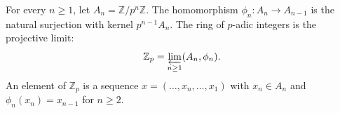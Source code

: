 For every $n \geq 1$, let $A_n = \mathbb{Z}/p^n\mathbb{Z}$. The homomorphism $\phi_n: A_n \rightarrow A_{n-1}$ is the natural surjection with kernel $p^{n-1}A_n$. The ring of $p$-adic integers is the projective limit:
$$\mathbb{Z}_p = \varprojlim_{n \geq 1} (A_n, \phi_n).$$
An element of $\mathbb{Z}_p$ is a sequence $x = (\ldots, x_n, \ldots, x_1)$ with $x_n \in A_n$ and $\phi_n(x_n) = x_{n-1}$ for $n \geq 2$.
